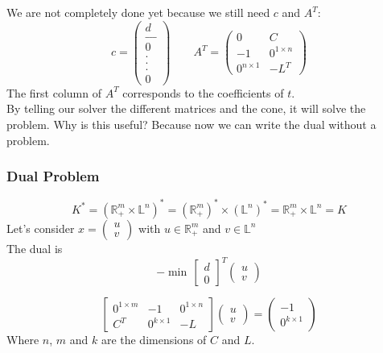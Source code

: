 We are not completely done yet because we still need $c$ and $A^T$:\\
$$c = \begin{pmatrix}
d\\
\_ \_ \_ \\
0\\
. \\
. \\
. \\
0
\end{pmatrix} \qquad A^T= \begin{pmatrix}
0 & C\\
-1 & 0^{1\times n}\\
0^{n\times 1} & -L^T
\end{pmatrix}
$$
The first column of $A^T$ corresponds to the coefficients of $t$. \\

By telling our solver the different matrices and the cone, it will solve the problem. Why is this useful? Because now we can write the dual without a problem.

\subsubsection{Dual Problem}
$$K^*= (\mathbb{R}^m_+ \times \mathbb{L}^n)^*= (\mathbb{R}^m_+)^* \times (\mathbb{L}^n)^*= \mathbb{R}^m_+ \times \mathbb{L}^n = K$$
Let's consider $x= \begin{pmatrix}
u \\
v
\end{pmatrix} $ with $u \in \mathbb{R}^m_+$ and $v \in \mathbb{L}^n$\\
The dual is 
$$-\min \, \begin{bmatrix}
d \\
0
\end{bmatrix}^T \begin{pmatrix}
u\\
v
\end{pmatrix} $$

\begin{equation}
\begin{bmatrix}
0^{1\times m} & -1 & 0^{1\times n}\\
C^T & 0^{k\times 1} & -L
\end{bmatrix}\begin{pmatrix}
u\\
v
\end{pmatrix}=
\begin{pmatrix}
-1\\
0^{k\times 1}
\end{pmatrix}
\end{equation}
Where $n$, $m$ and $k$ are the dimensions of $C$ and $L$.
 
